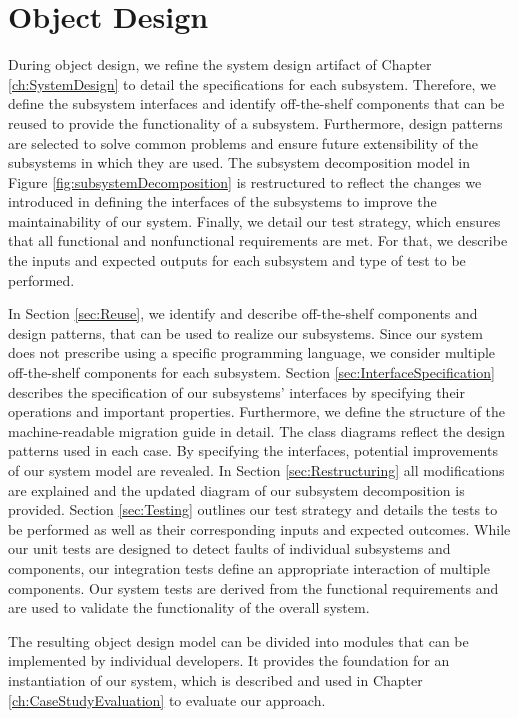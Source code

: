 \chapter{Object Design}
\label{ch:ObjectDesign}

During object design, we refine the system design artifact of Chapter \ref{ch:SystemDesign} to detail the specifications for each subsystem. Therefore, we define the subsystem interfaces and identify off-the-shelf components that can be reused to provide the functionality of a subsystem. Furthermore, design patterns are selected to solve common problems and ensure future extensibility of the subsystems in which they are used. The subsystem decomposition model in Figure \ref{fig:subsystemDecomposition} is restructured to reflect the changes we introduced in defining the interfaces of the subsystems to improve the maintainability of our system. Finally, we detail our test strategy, which ensures that all functional and nonfunctional requirements are met. For that, we describe the inputs and expected outputs for each subsystem and type of test to be performed. 

In Section \ref{sec:Reuse}, we identify and describe off-the-shelf components and design patterns, that can be used to realize our subsystems. Since our system does not prescribe using a specific programming language, we consider multiple off-the-shelf components for each subsystem. Section \ref{sec:InterfaceSpecification} describes the specification of our subsystems' interfaces by specifying their operations and important properties. Furthermore, we define the structure of the machine-readable migration guide in detail. The class diagrams reflect the design patterns used in each case. By specifying the interfaces, potential improvements of our system model are revealed. In Section \ref{sec:Restructuring} all modifications are explained and the updated diagram of our subsystem decomposition is provided. Section \ref{sec:Testing} outlines our test strategy and details the tests to be performed as well as their corresponding inputs and expected outcomes. While our unit tests are designed to detect faults of individual subsystems and components, our integration tests define an appropriate interaction of multiple components. Our system tests are derived from the functional requirements and are used to validate the functionality of the overall system.

The resulting object design model can be divided into modules that can be implemented by individual developers. It provides the foundation for an instantiation of our system, which is described and used in Chapter \ref{ch:CaseStudyEvaluation} to evaluate our approach.

\newpage



